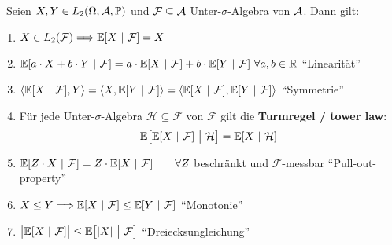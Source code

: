 \begin{proposition}\
Seien $X,Y\in L_2(\Omega,\mathcal{A},\mathbb{P})$ und $\mathcal{F}\subseteq\mathcal{A}$ Unter-$\sigma$-Algebra von $\mathcal{A}$. Dann gilt:
\begin{enumerate}
\item $X\in L_2(\mathcal{F})\Longrightarrow\mathbb{E}[X~|~\mathcal{F}]=X$
\item $\mathbb{E}[a\cdot X+b\cdot Y~|~\mathcal{F}]=a\cdot\mathbb{E}[X~|~\mathcal{F}]+b\cdot\mathbb{E}[Y~|~\mathcal{F}]~\forall a,b\in\mathbb{R}$ ``Linearität''
\item $\langle\mathbb{E}[X~|~\mathcal{F}],Y\rangle
=\langle X,\mathbb{E}[Y~|~\mathcal{F}]\rangle
=\langle\mathbb{E}[X~|~\mathcal{F}],\mathbb{E}[Y~|~\mathcal{F}]\rangle$ ``Symmetrie''
\item Für jede Unter-$\sigma$-Algebra $\mathcal{H}\subseteq\mathcal{F}$ von $\mathcal{F}$ gilt die \textbf{Turmregel / tower law}:
\begin{align}\label{Turmregel}
\mathbb{E}\big[\mathbb{E}[X~|~\mathcal{F}]~\big|~\mathcal{H}\big]=\mathbb{E}[X~|~\mathcal{H}]
\end{align}
\item $\mathbb{E}[Z\cdot X~|~\mathcal{F}]=Z\cdot\mathbb{E}[X~|~\mathcal{F}]\qquad\forall Z$ beschränkt und $\mathcal{F}$-messbar ``Pull-out-property''
\item $X\leq Y\Longrightarrow\mathbb{E}[X~|~\mathcal{F}]\leq\mathbb{E}[Y~|~\mathcal{F}]$ ``Monotonie''
\item $\big|\mathbb{E}[X~|~\mathcal{F}]\big|\leq\mathbb{E}\big[|X|~\big|~\mathcal{F}\big]$ ``Dreiecksungleichung''
\end{enumerate}
\end{proposition}

